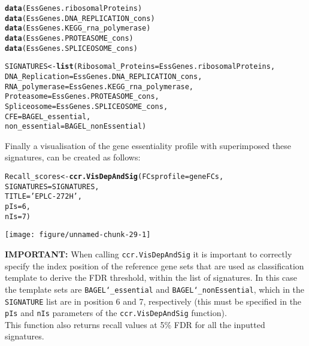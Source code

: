 \documentclass{article}\usepackage[]{graphicx}\usepackage[]{color}
\makeatletter
\def\maxwidth{ %
  \ifdim\Gin@nat@width>\linewidth
    \linewidth
  \else
    \Gin@nat@width
  \fi
}
\newcommand{\hlnum}[1]{\textcolor[rgb]{0.686,0.059,0.569}{#1}}%
\newcommand{\hlstr}[1]{\textcolor[rgb]{0.192,0.494,0.8}{#1}}%
\newcommand{\hlstd}[1]{\textcolor[rgb]{0.345,0.345,0.345}{#1}}%
\newcommand{\hlkwb}[1]{\textcolor[rgb]{0.69,0.353,0.396}{#1}}%
\newcommand{\hlkwc}[1]{\textcolor[rgb]{0.333,0.667,0.333}{#1}}%
\newcommand{\hlkwd}[1]{\textcolor[rgb]{0.737,0.353,0.396}{\textbf{#1}}}%
\newenvironment{kframe}{%
 \def\at@end@of@kframe{}%
 \ifinner\ifhmode%
  \def\at@end@of@kframe{\end{minipage}}%
  \begin{minipage}{\columnwidth}%
 \fi\fi%
 \def\FrameCommand##1{\hskip\@totalleftmargin \hskip-\fboxsep
 \colorbox{shadecolor}{##1}\hskip-\fboxsep
     \hskip-\linewidth \hskip-\@totalleftmargin \hskip\columnwidth}%
 \MakeFramed {\advance\hsize-\width
   \@totalleftmargin\z@ \linewidth\hsize
   \@setminipage}}%
 {\par\unskip\endMakeFramed%
 \at@end@of@kframe}
\newenvironment{knitrout}{}{} %
\makeatother
\begin{document}
\begin{knitrout}
\color{fgcolor}\begin{kframe}
\begin{alltt}
\hlkwd{data}\hlstd{(EssGenes.ribosomalProteins)}
\hlkwd{data}\hlstd{(EssGenes.DNA_REPLICATION_cons)}
\hlkwd{data}\hlstd{(EssGenes.KEGG_rna_polymerase)}
\hlkwd{data}\hlstd{(EssGenes.PROTEASOME_cons)}
\hlkwd{data}\hlstd{(EssGenes.SPLICEOSOME_cons)}

\hlstd{SIGNATURES}\hlkwb{<-}\hlkwd{list}\hlstd{(}\hlkwc{Ribosomal_Proteins}\hlstd{=EssGenes.ribosomalProteins,}
                 \hlkwc{DNA_Replication} \hlstd{= EssGenes.DNA_REPLICATION_cons,}
                 \hlkwc{RNA_polymerase} \hlstd{= EssGenes.KEGG_rna_polymerase,}
                 \hlkwc{Proteasome} \hlstd{= EssGenes.PROTEASOME_cons,}
                 \hlkwc{Spliceosome} \hlstd{= EssGenes.SPLICEOSOME_cons,}
                 \hlkwc{CFE} \hlstd{= BAGEL_essential,}
                 \hlkwc{non_essential} \hlstd{= BAGEL_nonEssential)}
\end{alltt}
\end{kframe}
\end{knitrout}
% 
Finally a visualisation of the gene essentiality profile with superimposed these signatures, can be created as follows:
 
\begin{knitrout}
\color{fgcolor}\begin{kframe}
\begin{alltt}
\hlstd{Recall_scores}\hlkwb{<-}\hlkwd{ccr.VisDepAndSig}\hlstd{(}\hlkwc{FCsprofile} \hlstd{= geneFCs,}
                             \hlkwc{SIGNATURES} \hlstd{= SIGNATURES,}
                             \hlkwc{TITLE} \hlstd{=} \hlstr{'EPLC-272H'}\hlstd{,}
                             \hlkwc{pIs} \hlstd{=} \hlnum{6}\hlstd{,}
                             \hlkwc{nIs} \hlstd{=} \hlnum{7}\hlstd{)}
\end{alltt}
\end{kframe}

{\centering \texttt{[image: figure/unnamed-chunk-29-1]} 

}



\end{knitrout}
% 
\textbf{IMPORTANT:} When calling \texttt{ccr.VisDepAndSig} it is important to correctly specify the index position of the reference gene sets that are used as classification template to derive the FDR threshold, within the list of signatures. In this case the template sets are \texttt{BAGEL\char`_essential} and \texttt{BAGEL\char`_nonEssential}, which in the \texttt{SIGNATURE} list are in position 6 and 7, respectively (this must be specified in the \texttt{pIs} and \texttt{nIs} parameters of the \texttt{ccr.VisDepAndSig} function).\\
% 
This function also returns recall values at 5\% FDR for all the inputted signatures.
\end{document}
